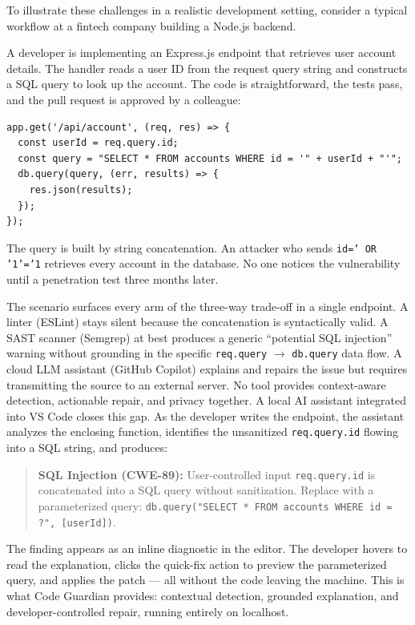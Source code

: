To illustrate these challenges in a realistic development setting, consider a typical workflow at a fintech company building a Node.js backend.

A developer is implementing an Express.js endpoint that retrieves user account details. The handler reads a user ID from the request query string and constructs a SQL query to look up the account. The code is straightforward, the tests pass, and the pull request is approved by a colleague:

\begin{lstlisting}[caption={Vulnerable Express.js endpoint with SQL injection}, label={lst:intro-scenario}]
app.get('/api/account', (req, res) => {
  const userId = req.query.id;
  const query = "SELECT * FROM accounts WHERE id = '" + userId + "'";
  db.query(query, (err, results) => {
    res.json(results);
  });
});
\end{lstlisting}

The query is built by string concatenation. An attacker who sends \texttt{id=' OR '1'='1} retrieves every account in the database. No one notices the vulnerability until a penetration test three months later.

The scenario surfaces every arm of the three-way trade-off in a single endpoint. A linter (ESLint) stays silent because the concatenation is syntactically valid. A SAST scanner (Semgrep) at best produces a generic ``potential SQL injection'' warning without grounding in the specific \texttt{req.query} $\to$ \texttt{db.query} data flow. A cloud LLM assistant (GitHub Copilot) explains and repairs the issue but requires transmitting the source to an external server. No tool provides context-aware detection, actionable repair, and privacy together. A local AI assistant integrated into VS Code closes this gap. As the developer writes the endpoint, the assistant analyzes the enclosing function, identifies the unsanitized \texttt{req.query.id} flowing into a SQL string, and produces:

\begin{quote}
\textbf{SQL Injection (CWE-89):} User-controlled input \texttt{req.query.id} is concatenated into a SQL query without sanitization. Replace with a parameterized query: \texttt{db.query("SELECT * FROM accounts WHERE id = ?", [userId])}.
\end{quote}

The finding appears as an inline diagnostic in the editor. The developer hovers to read the explanation, clicks the quick-fix action to preview the parameterized query, and applies the patch --- all without the code leaving the machine. This is what Code Guardian provides: contextual detection, grounded explanation, and developer-controlled repair, running entirely on localhost.

